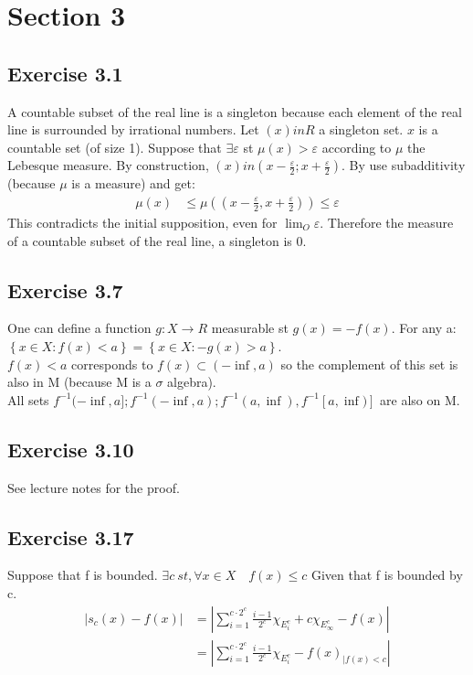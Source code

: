 \documentclass[11pt]{article}
\numberwithin{equation}{section}
\theoremstyle{plain}
\theoremstyle{definition}
\newcommand\braces[1]{\left\{ #1 \right\}}
\newcommand\abs[1]{\left| #1 \right|}
\def\ss{\subset}
\newcommand{\1}{\mathbbm 1}
\def\s{\sigma}
\newcommand{\e}{\varepsilon}
\begin{document}
\section*{Section 3} %
\label{sec:section_3}

\subsection*{Exercise 3.1} %

A countable subset of the real line is a singleton because each element of the real line is surrounded by irrational numbers.
Let $(x) in R$ a singleton set. $x$ is a countable set (of size 1). Suppose that $\exists \e$ st $\mu(x) > \e$ according to $\mu$ the Lebesque measure.
By construction, $(x) in (x - \frac{\e}{2} ; x + \frac{\e}{2})$.
By use subadditivity (because $\mu$ is a measure) and get:
\begin{align*}
	\mu(x) &\leq \mu((x-\frac{\e}{2}, x+\frac{\e}{2})) \leq \e
\end{align*}
This contradicts the initial supposition, even for $\lim_{O} \e$. Therefore the measure of a countable subset of the real line, a singleton is 0.




\subsection*{Exercise 3.7} %
One can define a function $g : X \to R$ measurable st $g(x) = -f(x)$. For any a:
$\braces{x \in X : f(x) <a} = \braces{x \in X : -g(x) >a}$.
\\
$f(x) < a $ corresponds to $f(x) \ss (-\inf, a) $ so the complement of this set is also in M (because M is a $\s$ algebra).
\\
All sets $f^{-1}(-\inf, a] ; f^{-1}(-\inf, a) ; f^{-1}(a, \inf) , f^{-1}[a, \inf)]$ are also on M.

\subsection*{Exercise 3.10}

See lecture notes for the proof.


\subsection*{Exercise 3.17}

Suppose that f is bounded. $\exists c \ st,\forall x \in X \quad f(x) \leq c$
Given that f is bounded by c.
\begin{align}
\abs{s_c(x) - f(x)} &= \abs{\sum_{i=1}^{c \cdot 2^{c}} \frac{i-1}{2^{c}} \chi_{E_{i}^{c}}+ c \chi_{E_{\infty}^{c}} - f(x)} \\
					&= \abs{\sum_{i=1}^{c \cdot 2^{c}} \frac{i-1}{2^{c}} \chi_{E_{i}^{c}} - f(x)_{|f(x)<c}}
\end{align}
\end{document}
